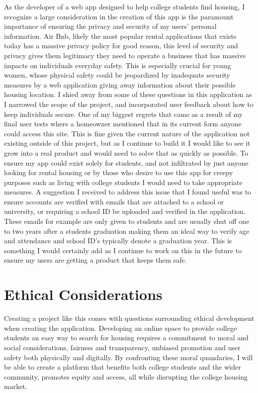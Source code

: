 \documentclass[10pt,twocolumn]{article}
\begin{document}
As the developer of a web app designed to help college students find housing, I recognize a large consideration in the creation of this app is the paramount importance of ensuring the privacy and security of my users' personal information. Air Bnb, likely the most popular rental applications that exists today has a massive privacy policy for good reason, this level of security and privacy gives them legitimacy they need to operate a business that has massive impacts on individuals everyday safety. \cite{airbnb_privacy} This is especially crucial for young women, whose physical safety could be jeopardized by inadequate security measures by a web application giving away information about their possible housing location. I shied away from some of these questions in this application as I narrowed the scope of the project, and incorporated user feedback about how to keep individuals secure. One of my biggest regrets that came as a result of my final user tests where a homeowner mentioned that in its current form anyone could access this site. This is fine given the current nature of the application not existing outside of this project, but as I continue to build it I would like to see it grow into a real product and would need to solve that as quickly as possible. To ensure my app could exist solely for students, and not infiltrated by just anyone looking for rental housing or by those who desire to use this app for creepy purposes such as living with college students I would need to take appropriate measures. A suggestion I received to address this issue that I found useful was to ensure accounts are verified with emails that are attached to a school or university, or requiring a school ID be uploaded and verified in the application. These emails for example are only given to students and are usually shut off one to two years after a students graduation making them an ideal way to verify age and attendance and school ID's typically denote a graduation year. This is something I would certainly add as I continue to work on this in the future to ensure my users are getting a product that keeps them safe.  

\section{Ethical Considerations}

Creating a project like this comes with questions surrounding ethical development when creating the application. Developing an online space to provide college students an easy way to search for housing requires a commitment to moral and social considerations, fairness and transparency, unbiased promotion and user safety both physically and digitally. By confronting these moral quandaries, I will be able to create a platform that benefits both college students and the wider community, promotes equity and access, all while disrupting the college housing market.
\end{document}
